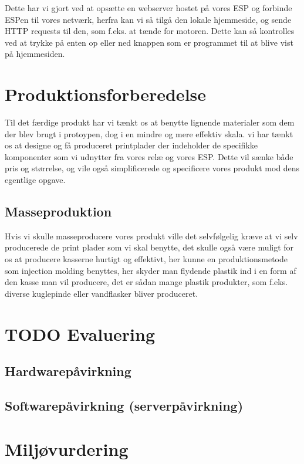 \documentclass[11pt]{article}
\begin{document}
Dette har vi gjort ved at opsætte en webserver hostet på vores ESP og forbinde ESPen til vores netværk, herfra kan vi så tilgå den lokale hjemmeside, og sende HTTP requests til den, som f.eks. at tænde for motoren. Dette kan så kontrolles ved at trykke på enten op eller ned knappen som er programmet til at blive vist på hjemmesiden.

\section{Produktionsforberedelse}
\label{sec:orge880538}
Til det færdige produkt har vi tænkt os at benytte lignende materialer som dem der blev brugt i protoypen, dog i en mindre og mere effektiv skala. vi har tænkt os at designe og få produceret printplader der indeholder de specifikke komponenter som vi udnytter fra vores relæ og vores ESP. Dette vil sænke både pris og størrelse, og vile også simplificerede og specificere vores produkt mod dens egentlige opgave. 


\subsection{Masseproduktion}
\label{sec:orge66eada}
Hvis vi skulle masseproducere vores produkt ville det selvfølgelig kræve at vi selv producerede de print plader som vi skal benytte, det skulle også være muligt for os at producere kasserne hurtigt og effektivt, her kunne en produktionsmetode som injection molding benyttes, her skyder man flydende plastik ind i en form af den kasse man vil producere, det er sådan mange plastik produkter, som f.eks. diverse kuglepinde eller vandflasker bliver produceret.

\section{{\bfseries\sffamily TODO} Evaluering}
\label{sec:org4ddb451}
\subsection{Hardwarepåvirkning}
\label{sec:org9e89a3f}
\subsection{Softwarepåvirkning (serverpåvirkning)}
\label{sec:org15c2cb6}

\newpage
\section{Miljøvurdering}
\label{sec:miljoevurdering}
\end{document}
